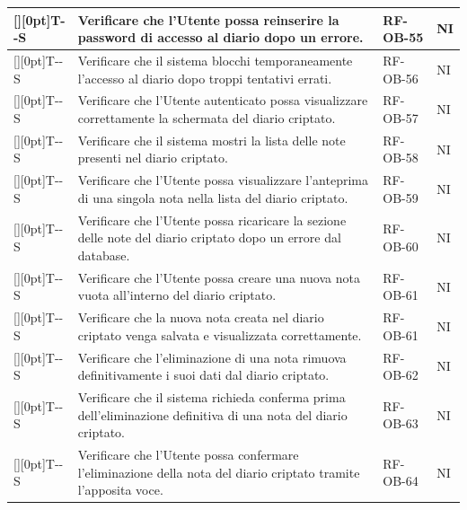 \documentclass[a4paper,12pt]{article}
\newcounter{testsys}
\newcommand{\systestcode}{%
  \raisebox{0pt}[\height][0pt]{\hypertarget{T-\arabic{testsys}-S}{}}T-\arabic{testsys}-S%
}
\begin{document}
\begin{longtable}{| >{\centering\arraybackslash}p{} | >{\raggedright\arraybackslash}p{} | >{\centering\arraybackslash}p{} | >{\centering\arraybackslash}p{} |}
\stepcounter{testsys} \systestcode & Verificare che l'Utente possa reinserire la password di accesso al diario dopo un errore. & RF-OB-55 & NI \\
\hline

\stepcounter{testsys} \systestcode & Verificare che il sistema blocchi temporaneamente l'accesso al diario dopo troppi tentativi errati. & RF-OB-56 & NI \\
\hline

\stepcounter{testsys} \systestcode & Verificare che l'Utente autenticato possa visualizzare correttamente la schermata del diario criptato. & RF-OB-57 & NI \\
\hline

\stepcounter{testsys} \systestcode & Verificare che il sistema mostri la lista delle note presenti nel diario criptato. & RF-OB-58 & NI \\
\hline

\stepcounter{testsys} \systestcode & Verificare che l'Utente possa visualizzare l'anteprima di una singola nota nella lista del diario criptato. & RF-OB-59 & NI \\
\hline

\stepcounter{testsys} \systestcode & Verificare che l'Utente possa ricaricare la sezione delle note del diario criptato dopo un errore dal database. & RF-OB-60 & NI \\
\hline

\stepcounter{testsys} \systestcode & Verificare che l'Utente possa creare una nuova nota vuota all'interno del diario criptato. & RF-OB-61 & NI \\
\hline

\stepcounter{testsys} \systestcode & Verificare che la nuova nota creata nel diario criptato venga salvata e visualizzata correttamente. & RF-OB-61 & NI \\
\hline

\stepcounter{testsys} \systestcode & Verificare che l'eliminazione di una nota rimuova definitivamente i suoi dati dal diario criptato. & RF-OB-62 & NI \\
\hline

\stepcounter{testsys} \systestcode & Verificare che il sistema richieda conferma prima dell'eliminazione definitiva di una nota del diario criptato. & RF-OB-63 & NI \\
\hline

\stepcounter{testsys} \systestcode & Verificare che l'Utente possa confermare l'eliminazione della nota del diario criptato tramite l'apposita voce. & RF-OB-64 & NI \\
\hline


\end{longtable}
\end{document}

